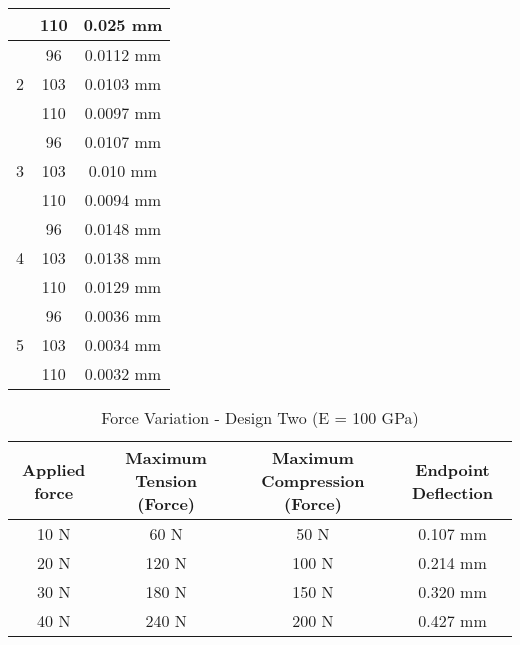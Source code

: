 \begin{table*}[hp]
\begin{tabular}{ccc}
		 & 110 & 0.025 mm \\
		\midrule
		 & 96 & 0.0112 mm \\
		2 & 103 & 0.0103 mm \\
		 & 110 & 0.0097 mm \\
		\midrule
		 & 96 &  0.0107 mm \\
		3 & 103 & 0.010 mm\\
		 & 110 & 0.0094 mm \\
		\midrule
		 & 96 & 0.0148 mm \\
		4 & 103 & 0.0138 mm \\
		 & 110 & 0.0129 mm \\
		\midrule
		 & 96 &  0.0036 mm \\
		5 & 103 &  0.0034 mm \\
		 & 110 & 0.0032 mm \\
		\bottomrule
	\end{tabular}
\end{table*}

\begin{table*}[hp]
	\centering
	\caption{Force Variation - Design Two (E = 100 GPa)}
	\label{tbl:forcesdesign2}
	\vspace{6pt}
	\begin{tabular}{cccc}
		\toprule
		Applied force & Maximum Tension (Force) & Maximum Compression (Force) & Endpoint Deflection \\
		\midrule
		10 N & 60 N & 50 N & 0.107 mm \\
		20 N & 120 N & 100 N & 0.214 mm \\
		30 N & 180 N & 150 N & 0.320 mm \\
		40 N & 240 N & 200 N & 0.427 mm \\
		\bottomrule
	\end{tabular}
\end{table*}


